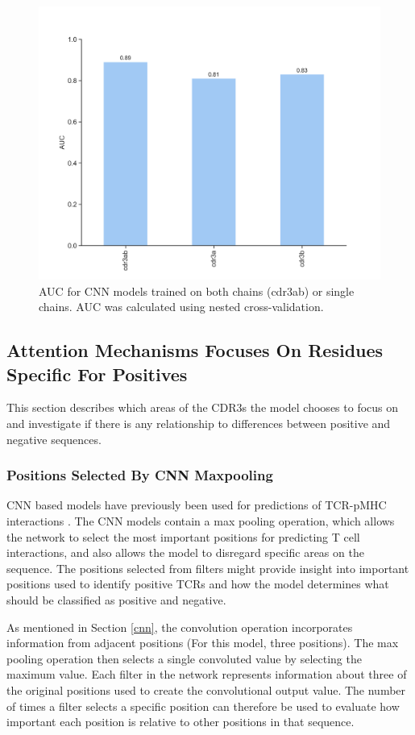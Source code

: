 \begin{figure}[H]
    \centering
    \includegraphics[width=0.75\linewidth]{figures/cdr3ab_vs_a_vs_b.png}
    \caption{AUC for CNN models trained on both chains (cdr3ab) or single chains. AUC was calculated using nested cross-validation.}
    \label{fig:cdrab_vs_a_b}
\end{figure}

\subsection{Attention Mechanisms Focuses On Residues Specific For Positives}
This section describes which areas of the CDR3s the model chooses to focus on and investigate if there is any relationship to differences between positive and negative sequences.

\subsubsection{Positions Selected By CNN Maxpooling}
CNN based models have previously been used for predictions of TCR-pMHC interactions \cite{IsabellJurtz2018NetTCR:Networks, Montemurro2021NetTCR-2.0Data}. The CNN models contain a max pooling operation, which allows the network to select the most important positions for predicting T cell interactions, and also allows the model to disregard specific areas on the sequence. The positions selected from filters might provide insight into important positions used to identify positive TCRs and how the model determines what should be classified as positive and negative.

As mentioned in Section \ref{cnn}, the convolution operation incorporates information from adjacent positions (For this model, three positions). The max pooling operation then selects a single convoluted value by selecting the maximum value. Each filter in the network represents information about three of the original positions used to create the convolutional output value. The number of times a filter selects a specific position can therefore be used to evaluate how important each position is relative to other positions in that sequence.

